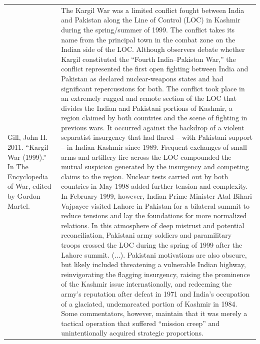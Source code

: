 {\begin{longtable}{p{}p{}}
Gill, John H. 2011. “Kargil War (1999).” In The Encyclopedia of War, edited by Gordon Martel. & The Kargil War was a limited conflict fought between India and Pakistan along the Line of Control (LOC) in Kashmir during the spring/summer of 1999. The conflict takes its name from the principal town in the combat zone on the Indian side of the LOC. Although observers debate whether Kargil constituted the “Fourth India–Pakistan War,” the conflict represented the first open fighting between India and Pakistan as declared nuclear-weapons states and had significant repercussions for both. The conflict took place in an extremely rugged and remote section of the LOC that divides the Indian and Pakistani portions of Kashmir, a region claimed by both countries and the scene of fighting in previous wars. It occurred against the backdrop of a violent separatist insurgency that had flared – with Pakistani support – in Indian Kashmir since 1989. Frequent exchanges of small arms and artillery fire across the LOC compounded the mutual suspicion generated by the insurgency and competing claims to the region. Nuclear tests carried out by both countries in May 1998 added further tension and complexity. In February 1999, however, Indian Prime Minister Atal Bihari Vajpayee visited Lahore in Pakistan for a bilateral summit to reduce tensions and lay the foundations for more normalized relations. In this atmosphere of deep mistrust and potential reconciliation, Pakistani army soldiers and paramilitary troops crossed the LOC during the spring of 1999 after the Lahore summit. (...). Pakistani motivations are also obscure, but likely included threatening a vulnerable Indian highway, reinvigorating the flagging insurgency, raising the prominence of the Kashmir issue internationally, and redeeming the army's reputation after defeat in 1971 and India's occupation of a glaciated, undemarcated portion of Kashmir in 1984. Some commentators, however, maintain that it was merely a tactical operation that suffered “mission creep” and unintentionally acquired strategic proportions.
\\

\end{longtable}}
